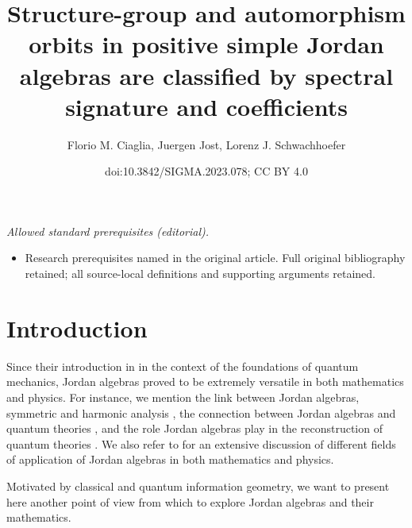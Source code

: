 \documentclass[10pt,a4paper]{amsart}
\title{Structure-group and automorphism orbits in positive simple Jordan algebras are classified by spectral signature and coefficients}
\author{Florio M. Ciaglia, Juergen Jost, Lorenz J. Schwachhoefer}
\date{doi:10.3842/SIGMA.2023.078; CC BY 4.0}
\numberwithin{equation}{section}
\begin{document}
\maketitle
\noindent\textit{Allowed standard prerequisites (editorial).}\begin{itemize}
\item Research prerequisites named in the original article. Full original bibliography retained; all source-local definitions and supporting arguments retained.
\end{itemize}\medskip
\section{Introduction}\label{sec: introduction}

Since their introduction in \cite{J-vN-W-1934} in the context of the foundations of quantum mechanics, Jordan algebras proved to be extremely versatile in both mathematics and physics.
For instance, we mention the link between Jordan algebras, symmetric and harmonic analysis \cite{Chu-2012,Chu-2017,F-K-1994,Koecher-1999,Upmeier-1985}, the connection between Jordan algebras and quantum theories \cite{Baez-2022,F-F-M-P-2014,F-F-I-M-2013}, and the role Jordan algebras play in the reconstruction of quantum theories \cite{Niestegge-2020,W-vdW-2022}.
We also refer to \cite{Iordanescu-2011} for an extensive discussion of different fields of application of Jordan algebras in both mathematics and physics.

Motivated by classical and quantum information geometry, we want to present here another point of view from which to explore Jordan algebras and their mathematics.
\end{document}
